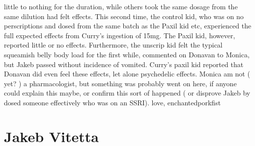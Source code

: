 \documentclass[12pt]{book}
\begin{document}
little to nothing for the duration, while others took the same dosage from the same dilution had felt effects. This second time, the control kid, who was on no perscriptions and dosed from the same batch as the Paxil kid etc, experienced the full expected effects from Curry's ingestion of 15mg. The Paxil kid, however, reported little or no effects. Furthermore, the unscrip kid felt the typical squeamish belly body load for the first while, commented on Donavan to Monica, but Jakeb passed without incidence of vomited. Curry's paxil kid reported that Donavan did even feel these effects, let alone psychedelic effects. Monica am not ( yet? ) a pharmacologist, but something was probably went on here, if anyone could explain this maybe, or confirm this sort of happened ( or disprove Jakeb by dosed someone effectively who was on an SSRI). love, enchantedporkfist



\chapter{Jakeb Vitetta}
\end{document}
